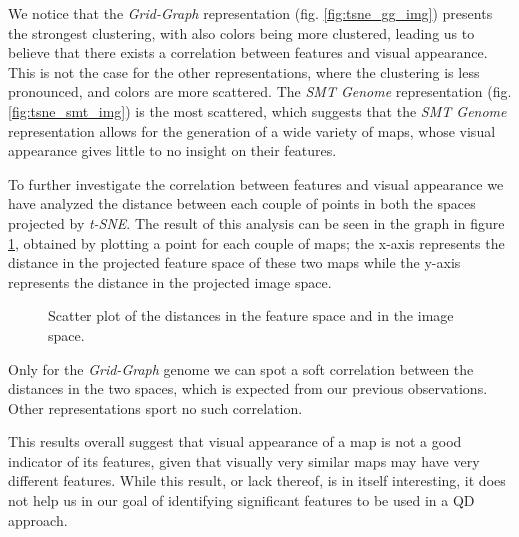 We notice that the \textit{Grid-Graph} representation (fig. \cref{fig:tsne_gg_img}) presents the strongest clustering, with also colors being more clustered, leading us to believe that there exists a correlation between features and visual appearance. This is not the case for the other representations, where the clustering is less pronounced, and colors are more scattered. The \textit{SMT Genome} representation (fig. \cref{fig:tsne_smt_img}) is the most scattered, which suggests that the \textit{SMT Genome} representation allows for the generation of a wide variety of maps, whose visual appearance gives little to no insight on their features.

To further investigate the correlation between features and visual appearance we have analyzed the distance between each couple of points in both the spaces projected by \textit{t-SNE}. The result of this analysis can be seen in the graph in figure \cref{fig:tsne_distance}, obtained by plotting a point for each couple of maps; the x-axis represents the distance in the projected feature space of these two maps while the y-axis represents the distance in the projected image space.

\begin{figure}[hbt!]
    \centering
    \qquad
    \qquad
    \qquad
    \qquad
    \caption{Scatter plot of the distances in the feature space and in the image space.}
    \label{fig:tsne_distance}
\end{figure}

Only for the \textit{Grid-Graph} genome we can spot a soft correlation between the distances in the two spaces, which is expected from our previous observations. Other representations sport no such correlation.

This results overall suggest that visual appearance of a map is not a good indicator of its features, given that visually very similar maps may have very different features. While this result, or lack thereof, is in itself interesting, it does not help us in our goal of identifying significant features to be used in a QD approach.

